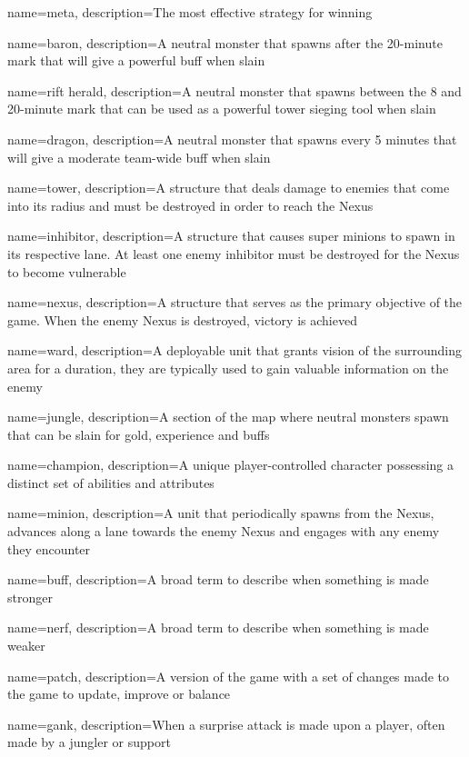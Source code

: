 
{
    name=meta,
    description={The most effective strategy for winning}
}

{
    name=baron,
    description={A neutral monster that spawns after the 20-minute mark that will give a powerful buff when slain}
}

{
    name=rift herald,
    description={A neutral monster that spawns between the 8 and 20-minute mark that can be used as a powerful tower sieging tool when slain}
}

{
    name=dragon,
    description={A neutral monster that spawns every 5 minutes that will give a moderate team-wide buff when slain}
}

{
    name=tower,
    description={A structure that deals damage to enemies that come into its radius and must be destroyed in order to reach the Nexus}
}

{
    name=inhibitor,
    description={A structure that causes super minions to spawn in its respective lane. At least one enemy inhibitor must be destroyed for the Nexus to become vulnerable}
}

{
    name=nexus,
    description={A structure that serves as the primary objective of the game.
    When the enemy Nexus is destroyed, victory is achieved}
}

{
    name=ward,
    description={A deployable unit that grants vision of the surrounding area for a duration, they are typically used to gain valuable information on the enemy}
}

{
    name=jungle,
    description={A section of the map where neutral monsters spawn that can be slain for gold, experience and buffs}
}

{
    name=champion,
    description={A unique player-controlled character possessing a distinct set of abilities and attributes}
}

{
    name=minion,
    description={A unit that periodically spawns from the Nexus, advances along a lane towards the enemy Nexus and engages with any enemy they encounter}
}

{
    name=buff,
    description={A broad term to describe when something is made stronger}
}

{
    name=nerf,
    description={A broad term to describe when something is made weaker}
}

{
    name=patch,
    description={A version of the game with a set of changes made to the game to update, improve or balance}
}

{
    name=gank,
    description={When a surprise attack is made upon a player, often made by a jungler or support}
}